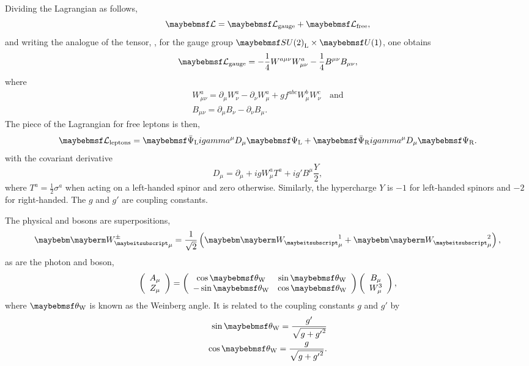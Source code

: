 Dividing the Lagrangian as follows,
\begin{equation*}
\lagrangiand = \lagrangiand_{\textrm{gauge}} + \lagrangiand_{\textrm{free}},
\end{equation*}
and writing the analogue of the tensor, \Fmunu, for the gauge group
$\SUtwo_{\textrm{L}}\times\Uone$, one obtains
\begin{equation*}
\lagrangiand_{\textrm{gauge}} = -\frac{1}{4} W^{a\mu\nu} W^a_{\mu\nu}
-\frac{1}{4} B^{\mu\nu}B_{\mu\nu},
\end{equation*}
where
\begin{eqnarray*}
W^{a}_{\mu\nu} = \partial_{\mu} W^a_{\nu} - \partial_{\nu}W^a_{\mu} + g f^{abc}
W^{b}_{\mu} W^c_{\nu}\quad\textrm{and}\\
B_{\mu\nu} = \partial_{\mu} B_{\nu} - \partial_{\nu} B_{\mu}.
\end{eqnarray*}
The piece of the Lagrangian for free leptons is then,
\begin{equation*}
\lagrangiand_{\textrm{leptons}} = \APsiL i \gamma^{\mu} D_{\mu} \PsiL + \APsiR i
\gamma^{\mu} D_{\mu} \PsiR.
\end{equation*}
with the covariant derivative
\begin{equation*}
D_{\mu} = \partial_{\mu} + i g W^a_{\mu} T^a + i g' B^{\mu}\frac{Y}{2},
\end{equation*}
where $T^a = \frac{1}{2}\sigma^a$ when acting on a left-handed spinor and
zero otherwise. Similarly, the hypercharge $Y$ is $-1$ for left-handed spinors
and $-2$ for right-handed. The $g$ and $g'$ are coupling constants.

The physical \PWp and \PWm bosons are superpositions,
\begin{equation*}
\PWpm_{\mu} = \frac{1}{\sqrt{2}}\left(\PW^1_{\mu} + \PW^2_{\mu}\right),
\end{equation*}
as are the photon and \PZ boson,
\begin{equation*}
\left(\begin{array}{c}A_{\mu} \\ Z_{\mu} \end{array}\right ) =
  \left ( \begin{array}{cc} \cos\thetaw & \sin\thetaw \\ -\sin\thetaw &
      \cos\thetaw\end{array}\right)
\left ( \begin{array}{c} B_{\mu} \\ W^3_{\mu} \end{array} \right ),
\end{equation*}
where $\thetaw$ is known as the Weinberg angle. It is related to the coupling
constants $g$ and $g'$ by
\begin{eqnarray}
\sin\thetaw = \frac{g'}{\sqrt{g + {g'}^2}} \\
\cos\thetaw = \frac{g}{\sqrt{g + {g'}^2}}.
\end{eqnarray}

